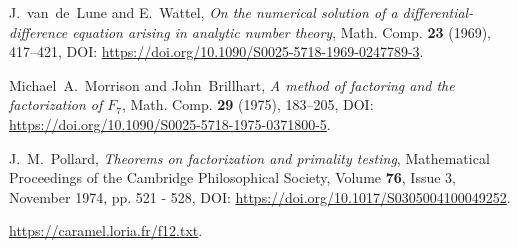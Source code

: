 \documentclass[a4paper, 11pt, pdftex]{report}
\theoremstyle{plain}
\theoremstyle{definition}
\begin{document}
\begin{thebibliography}{99}
 J.~van~de~Lune and E.~Wattel, \emph{On the numerical solution of a
differential-difference equation arising in analytic number theory}, Math. Comp. \textbf{23}
(1969), 417--421, DOI: \url{https://doi.org/10.1090/S0025-5718-1969-0247789-3}.

 Michael~A.~Morrison and John~Brillhart, \emph{A method of factoring
and the factorization of $F_7$}, Math. Comp. \textbf{29} (1975), 183--205,
DOI: \url{https://doi.org/10.1090/S0025-5718-1975-0371800-5}.

 J.~M.~Pollard, \emph{Theorems on factorization and  primality testing},
Mathematical Proceedings of the Cambridge Philosophical Society, Volume \textbf{76}, Issue 3,
November 1974, pp. 521 - 528, DOI: \url{https://doi.org/10.1017/S0305004100049252}.

 \url{https://caramel.loria.fr/f12.txt}.

\end{thebibliography}
\end{document}
